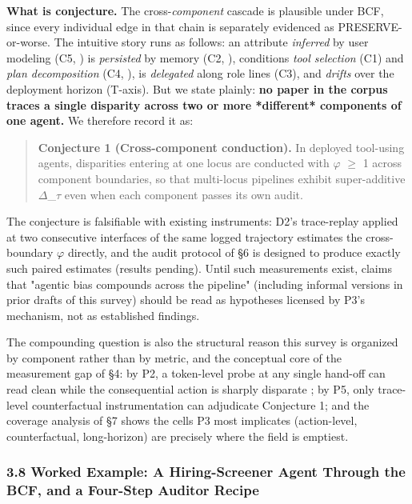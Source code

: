 \documentclass[10pt]{article}
\begin{document}
\textbf{What is conjecture.} The cross-\emph{component} cascade is plausible under BCF, since every individual edge in that chain is separately evidenced as PRESERVE-or-worse. The intuitive story runs as follows: an attribute \emph{inferred} by user modeling (C5, \cite{staab2023memorization}) is \emph{persisted} by memory (C2, \cite{ma2026implicit}), conditions \emph{tool selection} (C1) and \emph{plan decomposition} (C4, \cite{li2025actions}), is \emph{delegated} along role lines (C3), and \emph{drifts} over the deployment horizon (T-axis). But we state plainly: \textbf{no paper in the corpus traces a single disparity across two or more *different* components of one agent.} We therefore record it as:

\begin{quote}\textbf{Conjecture 1 (Cross-component conduction).} In deployed tool-using agents, disparities entering at one locus are conducted with $\varphi$ $\geq$ 1 across component boundaries, so that multi-locus pipelines exhibit super-additive $\Delta$\_$\tau$ even when each component passes its own audit.\end{quote}

The conjecture is falsifiable with existing instruments: D2's trace-replay applied at two consecutive interfaces of the same logged trajectory estimates the cross-boundary $\varphi$ directly, and the audit protocol of \S{}6 is designed to produce exactly such paired estimates (results pending). Until such measurements exist, claims that "agentic bias compounds across the pipeline" (including informal versions in prior drafts of this survey) should be read as hypotheses licensed by P3's mechanism, not as established findings.

The compounding question is also the structural reason this survey is organized by component rather than by metric, and the conceptual core of the measurement gap of \S{}4: by P2, a token-level probe at any single hand-off can read clean while the consequential action is sharply disparate \cite{li2025actions,xu2025quantifying}; by P5, only trace-level counterfactual instrumentation can adjudicate Conjecture 1; and the coverage analysis of \S{}7 shows the cells P3 most implicates (action-level, counterfactual, long-horizon) are precisely where the field is emptiest.

\subsubsection*{3.8 Worked Example: A Hiring-Screener Agent Through the BCF, and a Four-Step Auditor Recipe}
\end{document}
